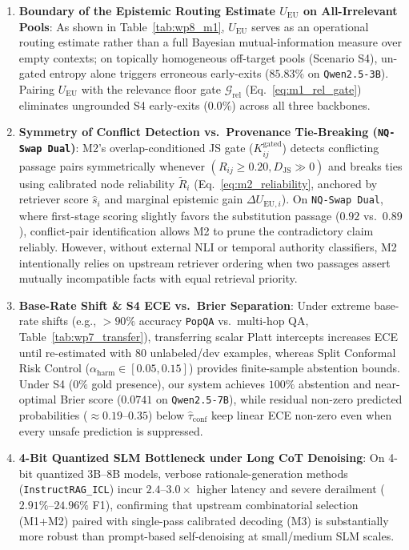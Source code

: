 \documentclass[11pt]{article}
\begin{document}
\begin{enumerate}[leftmargin=*,nosep]
    \item \textbf{Boundary of the Epistemic Routing Estimate $U_{\text{EU}}$ on All-Irrelevant Pools}: As shown in Table~\ref{tab:wp8_m1}, $U_{\text{EU}}$ serves as an operational routing estimate rather than a full Bayesian mutual-information measure over empty contexts; on topically homogeneous off-target pools (Scenario S4), un-gated entropy alone triggers erroneous early-exits ($85.83\%$ on \texttt{Qwen2.5-3B}). Pairing $U_{\text{EU}}$ with the relevance floor gate $\mathcal{G}_{\text{rel}}$ (Eq.~\eqref{eq:m1_rel_gate}) eliminates ungrounded S4 early-exits ($0.0\%$) across all three backbones.
    \item \textbf{Symmetry of Conflict Detection vs.\ Provenance Tie-Breaking (\texttt{NQ-Swap Dual})}: M2's overlap-conditioned JS gate ($K_{ij}^{\text{gated}}$) detects conflicting passage pairs symmetrically whenever $(R_{ij} \ge 0.20, D_{\text{JS}} \gg 0)$ and breaks ties using calibrated node reliability $\tilde{R}_i$ (Eq.~\eqref{eq:m2_reliability}, anchored by retriever score $\hat{s}_i$ and marginal epistemic gain $\Delta U_{\text{EU}, i}$). On \texttt{NQ-Swap Dual}, where first-stage scoring slightly favors the substitution passage ($0.92$ vs.\ $0.89$), conflict-pair identification allows M2 to prune the contradictory claim reliably. However, without external NLI or temporal authority classifiers, M2 intentionally relies on upstream retriever ordering when two passages assert mutually incompatible facts with equal retrieval priority.
    \item \textbf{Base-Rate Shift \& S4 ECE vs.\ Brier Separation}: Under extreme base-rate shifts (e.g., $>90\%$ accuracy \texttt{PopQA} vs.\ multi-hop QA, Table~\ref{tab:wp7_transfer}), transferring scalar Platt intercepts increases ECE until re-estimated with 80 unlabeled/dev examples, whereas Split Conformal Risk Control ($\alpha_{\text{harm}} \in [0.05, 0.15]$) provides finite-sample abstention bounds. Under S4 ($0\%$ gold presence), our system achieves $100\%$ abstention and near-optimal Brier score ($0.0741$ on \texttt{Qwen2.5-7B}), while residual non-zero predicted probabilities ($\approx 0.19\text{--}0.35$) below $\hat{\tau}_{\text{conf}}$ keep linear ECE non-zero even when every unsafe prediction is suppressed.
    \item \textbf{4-Bit Quantized SLM Bottleneck under Long CoT Denoising}: On 4-bit quantized 3B--8B models, verbose rationale-generation methods (\texttt{InstructRAG\_ICL}) incur $2.4\text{--}3.0\times$ higher latency and severe derailment ($2.91\%\text{--}24.96\%$ F1), confirming that upstream combinatorial selection (M1+M2) paired with single-pass calibrated decoding (M3) is substantially more robust than prompt-based self-denoising at small/medium SLM scales.
\end{enumerate}
\end{document}
